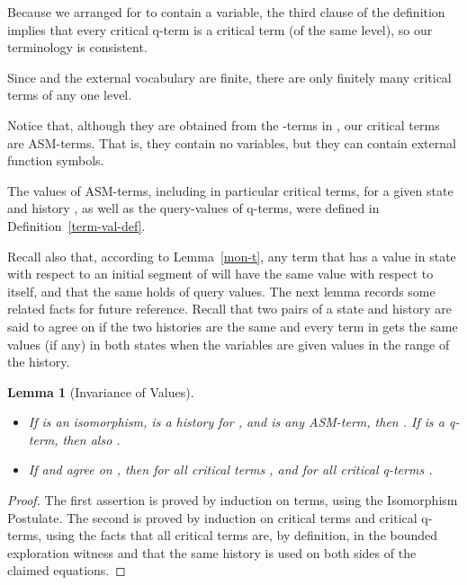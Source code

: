 \documentclass{LMCS}
\newtheorem{la}[thm]{Lemma}
\theoremstyle{definition}
\newenvironment{ls}{\begin{itemize}}{\end{itemize}}
\begin{document}
Because we arranged for  to contain a variable, the third clause of
the definition implies that every critical q-term is a critical term
(of the same level), so our terminology is consistent.

Since  and the external vocabulary  are finite, there are
only finitely many critical terms of any one level.

Notice that, although they are obtained from the -terms
in , our critical terms are ASM-terms.  That is, they
contain no variables, but they can contain external function
symbols.

The values of ASM-terms, including in particular critical terms, for
a given state  and history , as well as the query-values of
q-terms, were defined in Definition~\ref{term-val-def}.

Recall also that, according to Lemma~\ref{mon-t}, any term that has
a value in state  with respect to an initial segment of 
will have the same value with respect to  itself, and that the
same holds of query values. The next lemma records some related
facts for future reference. Recall that two pairs  of a
state and history are said to agree on  if the two histories are
the same and every term in  gets the same values (if any) in both
states when the variables are given values in the range of the
history.

\begin{la}[Invariance of Values]  \label{tag-val-invar}
\mbox{}
  \begin{ls}
    \item If  is an isomorphism,  is a history for
    , and  is any ASM-term, then .
    If  is a q-term, then also .
    \item If  and  agree on , then  for all critical terms , and
     for all critical q-terms .
  \end{ls}
\end{la}

\begin{proof}
  The first assertion is proved by induction on terms, using the
  Isomorphism Postulate.  The second is proved by induction on
  critical terms and critical q-terms, using the facts that all
  critical terms are, by definition, in the bounded exploration
  witness  and that the same history  is used on both sides of
  the claimed equations.
\end{proof}
\end{document}
